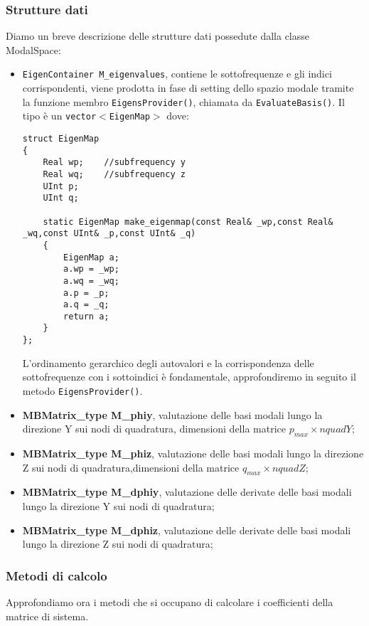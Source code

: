 \subsubsection{Strutture dati}
Diamo un breve descrizione delle strutture dati possedute dalla classe ModalSpace:
\begin{itemize}

\item \texttt{EigenContainer M\_eigenvalues}, contiene le sottofrequenze e gli indici corrispondenti, viene prodotta in fase di setting dello spazio modale tramite la funzione membro \texttt{EigensProvider()}, chiamata da \texttt{EvaluateBasis()}. Il tipo \`e un \texttt{vector$<$EigenMap$>$} dove:
 
\begin{lstlisting}[style = general]
struct EigenMap
{
	Real wp;	//subfrequency y
	Real wq;	//subfrequency z
	UInt p;
	UInt q;
	
	static EigenMap make_eigenmap(const Real& _wp,const Real& _wq,const UInt& _p,const UInt& _q)
	{
		EigenMap a;
		a.wp = _wp;
		a.wq = _wq;
		a.p = _p;
		a.q = _q;
		return a;	
	}
};
\end{lstlisting}
L'ordinamento gerarchico degli autovalori e la corrispondenza delle sottofrequenze con i sottoindici \`e fondamentale, approfondiremo in seguito il metodo \texttt{EigensProvider()}.

\item \textbf{MBMatrix\_type M\_phiy}, valutazione delle basi modali lungo la direzione Y sui nodi di quadratura, dimensioni della matrice $p_{max}\times nquadY$;

\item \textbf{MBMatrix\_type M\_phiz}, valutazione delle basi modali lungo la direzione Z sui nodi di quadratura,dimensioni della matrice $q_{max}\times nquadZ$;

\item \textbf{MBMatrix\_type M\_dphiy}, valutazione delle derivate delle basi modali lungo la direzione Y sui nodi di quadratura;

\item \textbf{MBMatrix\_type M\_dphiz}, valutazione delle derivate delle basi modali lungo la direzione Z sui nodi di quadratura;

\end{itemize}

\subsubsection{Metodi di calcolo}
Approfondiamo ora i metodi che si occupano di calcolare i coefficienti della matrice di sistema.

